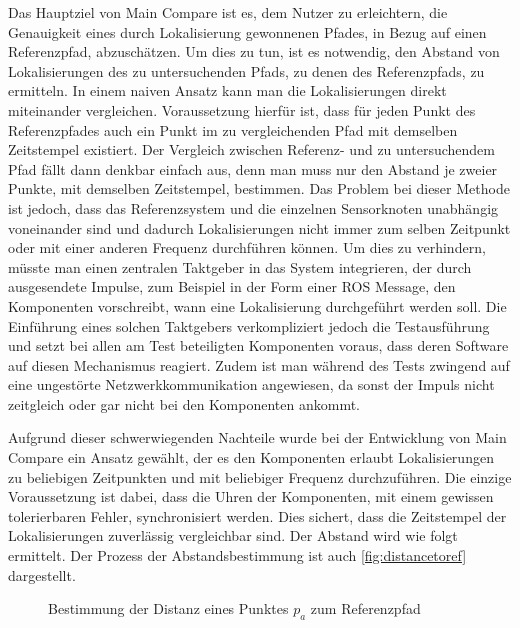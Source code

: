 Das Hauptziel von Main Compare ist es, dem Nutzer zu erleichtern, die
Genauigkeit eines durch Lokalisierung gewonnenen Pfades, in Bezug auf einen
Referenzpfad, abzuschätzen. Um dies zu tun, ist es notwendig, den Abstand von
Lokalisierungen des zu untersuchenden Pfads, zu denen des Referenzpfads, zu
ermitteln. In einem naiven Ansatz kann man die Lokalisierungen direkt
miteinander vergleichen. Voraussetzung hierfür ist, dass für jeden Punkt des Referenzpfades auch
ein Punkt im zu vergleichenden Pfad mit demselben Zeitstempel existiert. Der
Vergleich zwischen Referenz- und zu untersuchendem Pfad fällt dann denkbar
einfach aus, denn man muss nur den Abstand je
zweier Punkte, mit demselben Zeitstempel, bestimmen.
Das Problem bei dieser Methode ist jedoch, dass das Referenzsystem und die
einzelnen Sensorknoten unabhängig voneinander sind und dadurch Lokalisierungen
nicht immer zum selben Zeitpunkt oder mit einer anderen Frequenz durchführen 
können. Um dies zu verhindern, müsste man einen zentralen
Taktgeber in das System integrieren, der durch ausgesendete Impulse, zum
Beispiel in der Form einer ROS Message, den Komponenten vorschreibt,
wann eine Lokalisierung durchgeführt werden soll.
Die Einführung eines solchen Taktgebers verkompliziert jedoch die
Testausführung und setzt bei allen am Test beteiligten Komponenten voraus, dass
deren Software auf diesen Mechanismus reagiert. Zudem ist man während des Tests
zwingend auf eine ungestörte Netzwerkkommunikation angewiesen, da sonst der
Impuls nicht zeitgleich oder gar nicht bei den Komponenten ankommt.

Aufgrund dieser schwerwiegenden Nachteile wurde bei der Entwicklung von Main
Compare ein Ansatz gewählt, der es den Komponenten erlaubt Lokalisierungen zu
beliebigen Zeitpunkten und mit beliebiger Frequenz durchzuführen. Die einzige
Voraussetzung ist dabei, dass die Uhren der Komponenten, mit einem gewissen
tolerierbaren Fehler, synchronisiert werden. Dies sichert, dass die Zeitstempel der
Lokalisierungen zuverlässig vergleichbar sind. Der Abstand wird wie folgt
ermittelt. Der Prozess der Abstandsbestimmung ist auch
\autoref{fig:distancetoref} dargestellt.


\begin{figure}[t]
  \begin{center}
  \end{center}
  \caption{Bestimmung der Distanz eines Punktes $p_a$ zum Referenzpfad}
  \label{fig:distancetoref}
\end{figure}

